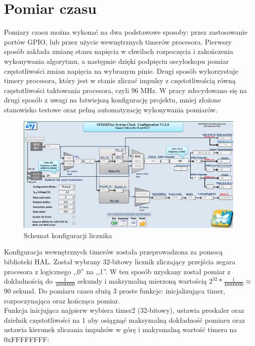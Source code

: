 \documentclass[oneside]{mgr}
\begin{document}
\chapter{Pomiar czasu}
Pomiary czasu można wykonać na dwa podstawowe sposoby: przez zastosowanie portów GPIO, lub przez użycie wewnętrznych timerów procesora. Pierwszy sposób zakłada zmianę stanu napięcia w chwilach rozpoczęcia i zakończenia wykonywania algorytmu, a następnie dzięki podpięciu oscyloskopu pomiar częstotliwości zmian napięcia na wybranym pinie. Drugi sposób wykorzystuje timery procesora, który jest w stanie zliczać impulsy z częstotliwością równą częstotliwości taktowania procesora, czyli 96 MHz. W pracy zdecydowano się na drugi sposób z uwagi na łatwiejszą konfigurację projektu, mniej złożone stanowisko testowe oraz pełną automatyzację wykonywania pomiarów.
\begin{center}
\begin{figure}[h]
\includegraphics[width = \textwidth]{liczniki}
\caption{Schemat konfiguracji licznika}
\end{figure}

\end{center}
Konfiguracja wewnętrznych timerów została przeprowadzona za pomocą biblioteki HAL. Został wybrany 32-bitowy licznik zliczający przejścia zegara procesora z logicznego ,,0'' na ,,1''. W ten sposób uzyskany został pomiar z dokładnością do $\frac{1}{48000000}$ sekundy i maksymalną mierzoną wartością $2^{32} * \frac{1}{48000000} \approx$ 90 sekund. Do pomiaru czasu służą 3 proste funkcje: inicjalizująca timer, rozpoczynająca oraz kończąca pomiar.
\\Funkcja inicjująca najpierw wybiera timer2 (32-bitowy), ustawia preskaler oraz dzielnik częstotliwości na 1 aby osiągnąć maksymalną dokładność pomiaru oraz ustawia kierunek zliczania impulsów w górę i makysmalną wartość timera na 0xFFFFFFFF:\\
\end{document}
